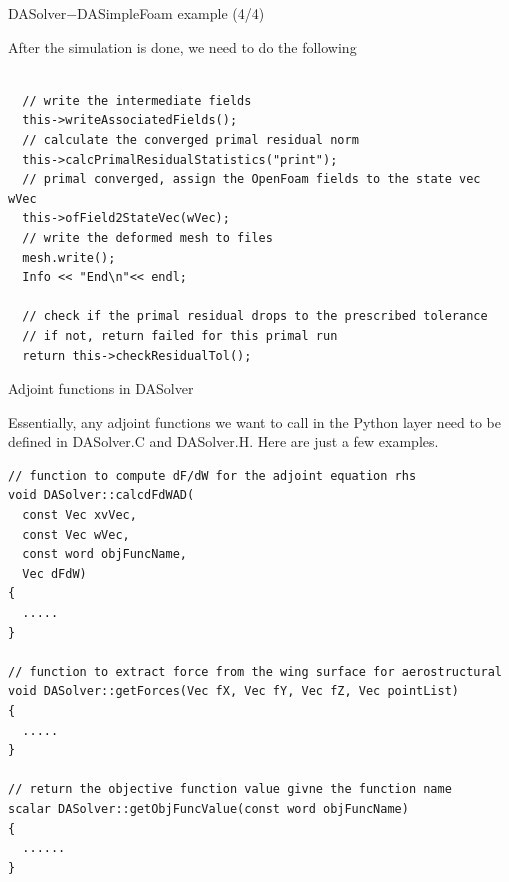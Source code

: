 \documentclass{bredelebeamer}
\begin{document}
\begin{frame}[fragile]{DASolver$-$DASimpleFoam example (4/4)}

After the simulation is done, we need to do the following
\footnotesize
\lstset{ language=c++ }
\begin{lstlisting}

  // write the intermediate fields
  this->writeAssociatedFields();
  // calculate the converged primal residual norm
  this->calcPrimalResidualStatistics("print");
  // primal converged, assign the OpenFoam fields to the state vec wVec
  this->ofField2StateVec(wVec);
  // write the deformed mesh to files
  mesh.write();
  Info << "End\n"<< endl;

  // check if the primal residual drops to the prescribed tolerance
  // if not, return failed for this primal run
  return this->checkResidualTol();
\end{lstlisting}
\normalsize

\end{frame}

\begin{frame}[fragile]{Adjoint functions in DASolver}

Essentially, any adjoint functions we want to call in the Python layer need to be defined in DASolver.C and DASolver.H. Here are just a few examples.
\footnotesize
\lstset{ language=c++ }
\begin{lstlisting}
// function to compute dF/dW for the adjoint equation rhs
void DASolver::calcdFdWAD(
  const Vec xvVec,
  const Vec wVec,
  const word objFuncName,
  Vec dFdW)
{
  .....
}

// function to extract force from the wing surface for aerostructural
void DASolver::getForces(Vec fX, Vec fY, Vec fZ, Vec pointList)
{
  .....
}

// return the objective function value givne the function name
scalar DASolver::getObjFuncValue(const word objFuncName)
{
  ......
}
\end{lstlisting}
\normalsize

\end{frame}
\end{document}
